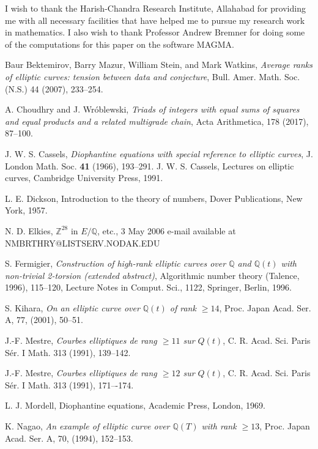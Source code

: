 \documentclass[11pt, leqno]{article}
\begin{document}
I wish to  thank the Harish-Chandra Research Institute, Allahabad for providing me with all necessary facilities that have helped me to pursue my research work in mathematics. I also wish to thank Professor Andrew Bremner for doing some of the computations for this paper on the software MAGMA.
\begin{thebibliography}{99}


 Baur Bektemirov, Barry Mazur, William Stein, and Mark Watkins, {\it Average ranks of elliptic
curves: tension between data and conjecture}, Bull. Amer. Math. Soc. (N.S.) 44 (2007), 233--254.

 A. Choudhry and  J. Wr\'oblewski, {\it Triads of integers with equal sums of squares and equal products and a related multigrade chain}, Acta Arithmetica,  178 (2017),  87--100.

 J. W. S. Cassels, {\it Diophantine equations with special reference to elliptic curves}, J. London Math. Soc. {\bf 41} (1966), 193--291.
 J. W. S. Cassels, Lectures on elliptic curves, Cambridge University Press, 1991. 

 L. E. Dickson, Introduction to the theory of numbers, Dover Publications, New York, 1957.

 N. D. Elkies,  $\mathbb{Z}^{28}$ in  $E/\mathbb{Q}$, etc., 3 May 2006 e-mail available at NMBRTHRY@LISTSERV.NODAK.EDU

 S. Fermigier, {\it Construction of high-rank elliptic curves over $\mathbb{Q}$ and $\mathbb{Q}(t)$ with non-trivial
2-torsion (extended abstract)}, Algorithmic number theory (Talence, 1996), 115--120, Lecture Notes in Comput. Sci.,
1122, Springer, Berlin, 1996.

 S. Kihara, {\it On an elliptic curve over $\mathbb{Q}(t)$ of rank $\geq 14$}, Proc. Japan Acad. Ser. A, 77,  (2001), 50--51.

 J.-F.  Mestre, {\it Courbes elliptiques de rang $≥11$ sur $Q(t)$}, C. R. Acad. Sci. Paris Sér. I Math. 313 (1991), 139--142.

 J.-F.  Mestre, {\it Courbes elliptiques de rang $≥12$ sur $Q(t)$},  C. R. Acad. Sci. Paris Sér. I Math. 313 (1991), 171–-174.
 
 L. J. Mordell, Diophantine equations, Academic Press, London, 1969. 

 K. Nagao, {\it An example of elliptic curve over $\mathbb{Q}(T)$ with rank $\geq 13$}, Proc. Japan Acad. Ser. A, 70,  (1994), 152--153.



\end{thebibliography}
\end{document}
